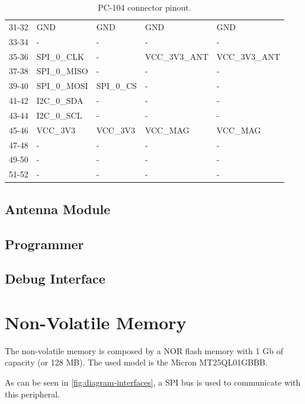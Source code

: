 \begin{table}[!h]
\begin{tabular}{cllll}
        31-32              & GND              & GND              & GND           & GND           \\
        33-34              & -                & -                & -             & -             \\
        35-36              & SPI\_0\_CLK      & -                & VCC\_3V3\_ANT & VCC\_3V3\_ANT \\
        37-38              & SPI\_0\_MISO     & -                & -             & -             \\
        39-40              & SPI\_0\_MOSI     & SPI\_0\_CS       & -             & -             \\
        41-42              & I2C\_0\_SDA      & -                & -             & -             \\
        43-44              & I2C\_0\_SCL      & -                & -             & -             \\
        45-46              & VCC\_3V3         & VCC\_3V3         & VCC\_MAG      & VCC\_MAG      \\
        47-48              & -                & -                & -             & -             \\
        49-50              & -                & -                & -             & -             \\
        51-52              & -                & -                & -             & -             \\
        \bottomrule[1.5pt]
    \end{tabular}
    \caption{PC-104 connector pinout.}
    \label{tab:pc104-pins}
\end{table}

\subsection{Antenna Module}



\subsection{Programmer}



\subsection{Debug Interface}


\section{Non-Volatile Memory}

The non-volatile memory is composed by a NOR flash memory with 1 Gb of capacity (or 128 MB). The used model is the Micron MT25QL01GBBB.

As can be seen in \autoref{fig:diagram-interfaces}, a SPI bus is used to communicate with this peripheral.
